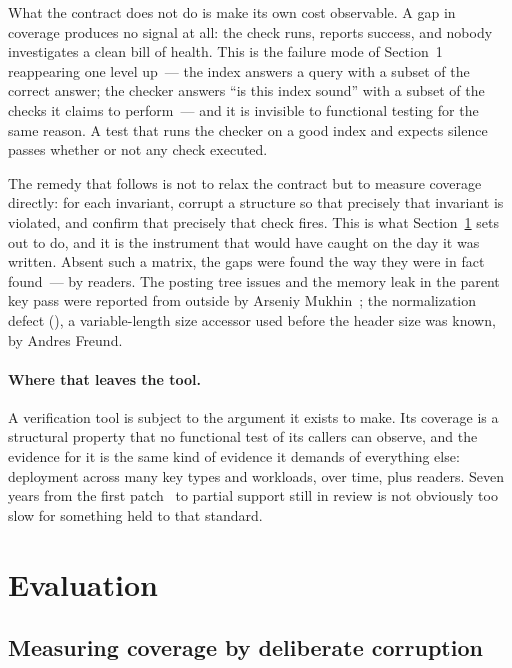 What the contract does not do is make its own cost observable. A gap in coverage
produces no signal at all: the check runs, reports success, and nobody
investigates a clean bill of health. This is the failure mode of Section~1
reappearing one level up~--- the index answers a query with a subset of the
correct answer; the checker answers ``is this index sound'' with a subset of the
checks it claims to perform~--- and it is invisible to functional testing for the
same reason. A test that runs the checker on a good index and expects silence
passes whether or not any check executed.

The remedy that follows is not to relax the contract but to measure coverage
directly: for each invariant, corrupt a structure so that precisely that
invariant is violated, and confirm that precisely that check fires. This is what
Section~\ref{sec:eval} sets out to do, and it is the instrument that would have
caught  on the day it was written. Absent such a matrix, the
gaps were found the way they were in fact found~--- by readers. The posting tree
issues and the memory leak in the parent key pass were reported from outside by
Arseniy Mukhin~\cite{thread-gin-amcheck-leak}; the normalization defect
(), a variable-length size accessor used before the header size
was known, by Andres Freund.

\paragraph{Where that leaves the tool.} A verification tool is subject to the
argument it exists to make. Its coverage is a structural property that no
functional test of its callers can observe, and the evidence for it is the same
kind of evidence it demands of everything else: deployment across many key types
and workloads, over time, plus readers. Seven years from the first
patch~\cite{thread-amcheck-gist-2018} to partial support still in review is not
obviously too slow for something held to that standard.

\section{Evaluation}
\label{sec:eval}

\subsection{Measuring coverage by deliberate corruption}

